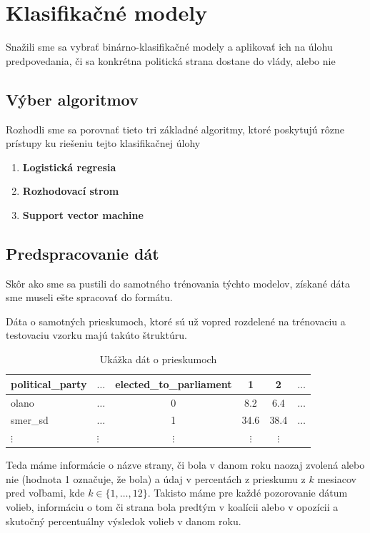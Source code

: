 \documentclass[main.tex]{subfiles}
\begin{document}
	
\section{Klasifikačné modely}	
Snažili sme sa vybrať binárno-klasifikačné modely a aplikovať ich na úlohu predpovedania, či sa konkrétna politická strana dostane do vlády, alebo nie

\subsection{Výber algoritmov}
Rozhodli sme sa porovnať tieto tri základné algoritmy, ktoré poskytujú rôzne prístupy ku riešeniu tejto klasifikačnej úlohy

\begin{enumerate}
    \item \textbf{Logistická regresia}
    \item \textbf{Rozhodovací strom}
    \item \textbf{Support vector machine}
\end{enumerate}

\subsection{Predspracovanie dát}
Skôr ako sme sa pustili do samotného trénovania týchto modelov, získané dáta sme museli ešte spracovať do  formátu.

Dáta o samotných prieskumoch, ktoré sú už vopred rozdelené na trénovaciu a testovaciu vzorku majú takúto štruktúru.

\begin{table}[h!]
    \centering
    \caption{Ukážka dát o prieskumoch}
    \begin{tabular}{llcccl}
        \toprule
        \textbf{political\_party} & \textbf{$\ldots$} & \textbf{elected\_to\_parliament} & \textbf{1} & \textbf{2} & \textbf{$\ldots$} \\
        \midrule
        olano    & $\ldots$ & 0        & 8.2      & 6.4 & $\ldots$ \\
        smer\_sd & $\ldots$ & 1        & 34.6     & 38.4 & $\ldots$ \\
        $\vdots$ & $\vdots$ & $\vdots$ & $\vdots$ & $\vdots$ \\ 
        \bottomrule
    \end{tabular}
\end{table}

Teda máme informácie o názve strany, či bola v danom roku naozaj zvolená alebo nie (hodnota 1 označuje, že bola) a údaj v percentách z prieskumu z $k$ mesiacov pred voľbami, kde $k \in \{ 1, \ldots , 12 \}$. Takisto máme pre každé pozorovanie dátum volieb, informáciu o tom či strana bola predtým v koalícii alebo v opozícii a skutočný percentuálny výsledok volieb v danom roku.
\end{document}
